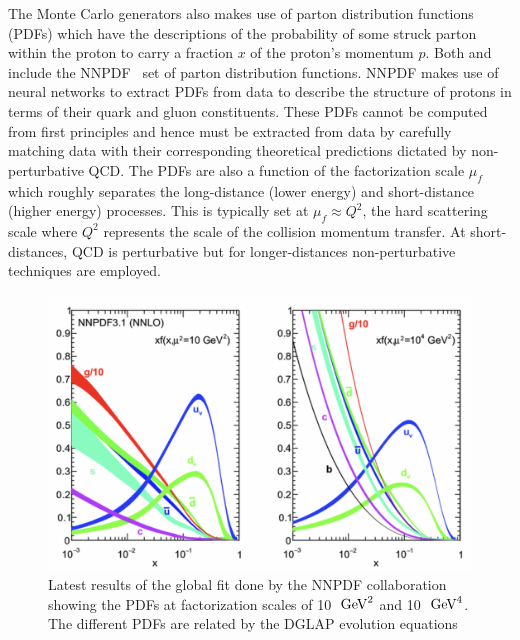 The Monte Carlo generators also makes use of parton distribution functions (PDFs) which have the descriptions of the probability of some struck parton within the proton to carry a fraction $x$ of the proton's momentum $p$. Both \SHERPA and  include the NNPDF~\cite{NNPDF:2021uiq} set of parton distribution functions. NNPDF makes use of neural networks to extract PDFs from data to describe the structure of protons in terms of their quark and gluon constituents. These PDFs cannot be computed from first principles and hence must be extracted from data by carefully matching data with their corresponding theoretical predictions dictated by non-perturbative QCD. The PDFs are also a function of the factorization scale $\mu_{f}$ which roughly separates the long-distance (lower energy) and short-distance (higher energy) processes. This is typically set at $\mu_{f}\approx Q^{2}$, the hard scattering scale where $Q^2$ represents the scale of the collision momentum transfer. At short-distances, QCD is perturbative but for longer-distances non-perturbative techniques are employed. 


\begin{figure}[!htb]
	\centering
	\includegraphics[scale=0.5]{fig/NNPDFGlobalFit.png}
	\caption{Latest results of the global fit done by the NNPDF collaboration showing the PDFs at factorization scales of 10~$\,\text{Ge\hspace{-.08em}V}^{2}$ and 10~$\,\text{Ge\hspace{-.08em}V}^{4}$. The different PDFs are related by the DGLAP evolution equations~\cite{DelDebbio:2018siw}}
	\label{fig:NNPDF}
\end{figure}

